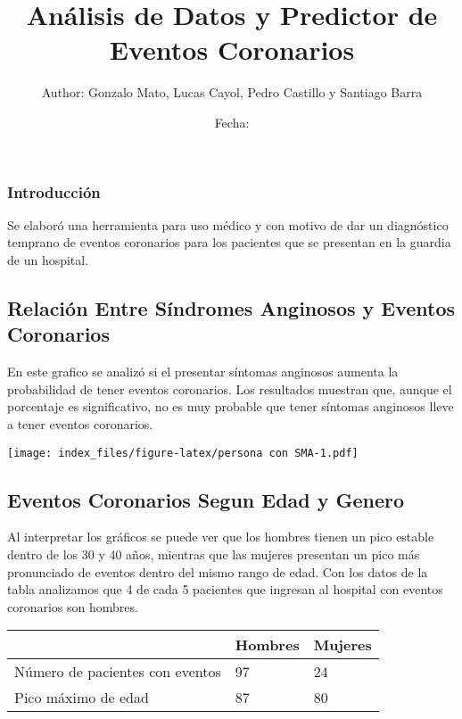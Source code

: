 \documentclass[
]{article}
\title{Análisis de Datos y Predictor de Eventos Coronarios}
\author{Author: Gonzalo Mato, Lucas Cayol, Pedro Castillo y Santiago Barra}
\date{Fecha:}
\begin{document}
\maketitle

\hypertarget{introducciuxf3n}{%
\subsubsection{Introducción}\label{introducciuxf3n}}

Se elaboró una herramienta para uso médico y con motivo de dar un
diagnóstico temprano de eventos coronarios para los pacientes que se
presentan en la guardia de un hospital.

\hypertarget{relaciuxf3n-entre-suxedndromes-anginosos-y-eventos-coronarios}{%
\subsection{Relación Entre Síndromes Anginosos y Eventos
Coronarios}\label{relaciuxf3n-entre-suxedndromes-anginosos-y-eventos-coronarios}}

En este grafico se analizó si el presentar síntomas anginosos aumenta la
probabilidad de tener eventos coronarios. Los resultados muestran que,
aunque el porcentaje es significativo, no es muy probable que tener
síntomas anginosos lleve a tener eventos coronarios.

\texttt{[image: index\_files/figure-latex/persona con SMA-1.pdf]}

\hypertarget{eventos-coronarios-segun-edad-y-genero}{%
\subsection{Eventos Coronarios Segun Edad y
Genero}\label{eventos-coronarios-segun-edad-y-genero}}

Al interpretar los gráficos se puede ver que los hombres tienen un pico
estable dentro de los 30 y 40 años, mientras que las mujeres presentan
un pico más pronunciado de eventos dentro del mismo rango de edad. Con
los datos de la tabla analizamos que 4 de cada 5 pacientes que ingresan
al hospital con eventos coronarios son hombres.

\begin{longtable}[]{@{}lll@{}}
\toprule
& Hombres & Mujeres\tabularnewline
\midrule
\endhead
Número de pacientes con eventos & 97 & 24\tabularnewline
Pico máximo de edad & 87 & 80\tabularnewline
\bottomrule
\end{longtable}
\end{document}
